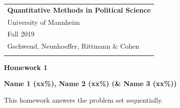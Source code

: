 \documentclass[a4paper,12pt]{article} %
\begin{document}



\thispagestyle{empty} %

\begin{tabular}{p{15.5cm}} %
{\large \bf Quantitative Methods in Political Science} \\
University of Mannheim \\ Fall 2019  \\ Gschwend, Neunhoeffer, Rittmann \& Cohen\\
\hline %
\\
\end{tabular} %

\vspace*{0.3cm} %

\begin{center} %
	{\Large \bf Homework 1} %
	\vspace{2mm}
	
	{\bf Name 1 (xx\%), Name 2 (xx\%) (\& Name 3 (xx\%))} %
		
\end{center}  

\vspace{0.4cm}



This homework answers the problem set sequentially. 
\end{document}
